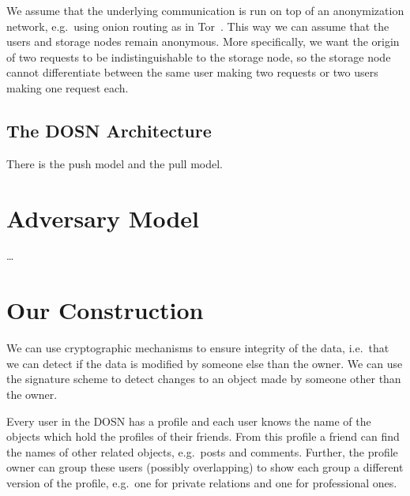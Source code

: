 We assume that the underlying communication is run on top of an anonymization 
network, e.g.\ using onion routing as in Tor~\cite{Tor}.
This way we can assume that the users and storage nodes remain anonymous.
More specifically, we want the origin of two requests to be
indistinguishable to the storage node, so the storage node cannot differentiate 
between the same user making two requests or two users making one request each.

\subsection{The \acs{DOSN} Architecture}
There is the push model and the pull model.


\section{Adversary Model}
\dots


\section{Our Construction}\label{sec:Contribution}

We can use cryptographic mechanisms to ensure integrity of the data, i.e.\ that 
we can detect if the data is modified by someone else than the owner.
We can use the signature scheme to detect changes to an object made by someone 
other than the owner.

Every user in the \ac{DOSN} has a profile and each user knows the name of the 
objects which hold the profiles of their friends.
From this profile a friend can find the names of other related objects, 
e.g.~posts and comments.
Further, the profile owner can group these users (possibly overlapping) to show 
each group a different version of the profile, e.g.~one for private relations 
and one for professional ones.

%
%
%
%

